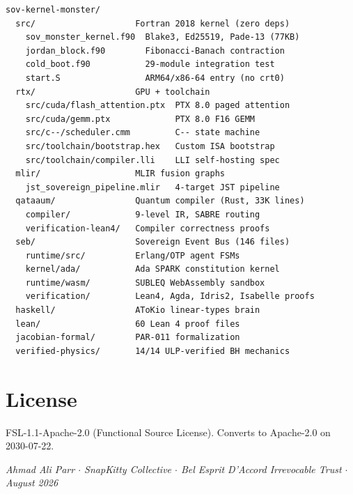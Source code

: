 \documentclass[11pt,a4paper]{article}
\begin{document}
\begin{lstlisting}[language={}]
sov-kernel-monster/
  src/                    Fortran 2018 kernel (zero deps)
    sov_monster_kernel.f90  Blake3, Ed25519, Pade-13 (77KB)
    jordan_block.f90        Fibonacci-Banach contraction
    cold_boot.f90           29-module integration test
    start.S                 ARM64/x86-64 entry (no crt0)
  rtx/                    GPU + toolchain
    src/cuda/flash_attention.ptx  PTX 8.0 paged attention
    src/cuda/gemm.ptx             PTX 8.0 F16 GEMM
    src/c--/scheduler.cmm         C-- state machine
    src/toolchain/bootstrap.hex   Custom ISA bootstrap
    src/toolchain/compiler.lli    LLI self-hosting spec
  mlir/                   MLIR fusion graphs
    jst_sovereign_pipeline.mlir   4-target JST pipeline
  qataaum/                Quantum compiler (Rust, 33K lines)
    compiler/             9-level IR, SABRE routing
    verification-lean4/   Compiler correctness proofs
  seb/                    Sovereign Event Bus (146 files)
    runtime/src/          Erlang/OTP agent FSMs
    kernel/ada/           Ada SPARK constitution kernel
    runtime/wasm/         SUBLEQ WebAssembly sandbox
    verification/         Lean4, Agda, Idris2, Isabelle proofs
  haskell/                AToKio linear-types brain
  lean/                   60 Lean 4 proof files
  jacobian-formal/        PAR-011 formalization
  verified-physics/       14/14 ULP-verified BH mechanics
\end{lstlisting}

\section*{License}

FSL-1.1-Apache-2.0 (Functional Source License). Converts to
Apache-2.0 on 2030-07-22.

\medskip
\noindent
\textit{Ahmad Ali Parr $\cdot$ SnapKitty Collective $\cdot$
Bel Esprit D'Accord Irrevocable Trust $\cdot$ August 2026}
\end{document}

